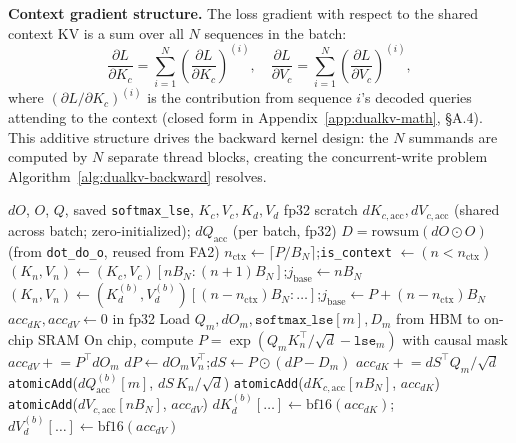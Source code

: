 \documentclass{article}
\begin{document}
\textbf{Context gradient structure.} The loss gradient with respect to the shared context KV is a sum over all $N$ sequences in the batch:
\begin{equation}
  \frac{\partial L}{\partial K_c} = \sum_{i=1}^{N} \left(\frac{\partial L}{\partial K_c}\right)^{(i)}, \quad
  \frac{\partial L}{\partial V_c} = \sum_{i=1}^{N} \left(\frac{\partial L}{\partial V_c}\right)^{(i)},
  \label{eq:dualkv-ctx-grad}
\end{equation}
where $(\partial L / \partial K_c)^{(i)}$ is the contribution from sequence $i$'s decoded queries attending to the context (closed form in Appendix~\ref{app:dualkv-math}, \S A.4). This additive structure drives the backward kernel design: the $N$ summands are computed by $N$ separate thread blocks, creating the concurrent-write problem Algorithm~\ref{alg:dualkv-backward} resolves.


\begin{algorithm}[H]
\small
\caption{DualKV backward main kernel (launched on grid $(n_{\text{ctx}} + n_{\text{dec}},\; N,\; H)$)}
\label{alg:dualkv-backward}
\begin{algorithmic}[1]
\Require $dO$, $O$, $Q$, saved \texttt{softmax\_lse}, $K_c, V_c, K_d, V_d$
\Require fp32 scratch $dK_{c,\text{acc}}, dV_{c,\text{acc}}$ (shared across batch; zero-initialized); $dQ_{\text{acc}}$ (per batch, fp32)
\Require $D = \text{rowsum}(dO \odot O)$ (from \texttt{dot\_do\_o}, reused from FA2)
 
    \State $n_{\text{ctx}} \gets \lceil P / B_N \rceil$;\quad \texttt{is\_context} $\gets (n < n_{\text{ctx}})$
        \State $(K_n, V_n) \gets (K_c, V_c)[n B_N : (n{+}1) B_N]$;\quad $j_{\text{base}} \gets n B_N$
    \Else
        \State $(K_n, V_n) \gets (K_d^{(b)}, V_d^{(b)})[(n{-}n_{\text{ctx}}) B_N : \ldots]$;\quad $j_{\text{base}} \gets P + (n{-}n_{\text{ctx}}) B_N$
    \EndIf
    \State $acc_{dK}, acc_{dV} \gets 0$ in fp32
        \State Load $Q_m, dO_m, \texttt{softmax\_lse}[m], D_m$ from HBM to on-chip SRAM
        \State On chip, compute $P = \exp(Q_m K_n^\top / \sqrt{d} - \texttt{lse}_m)$ with causal mask 
        \State $acc_{dV} \mathrel{+}= P^\top dO_m$
        \State $dP \gets dO_m V_n^\top$;\quad $dS \gets P \odot (dP - D_m)$
        \State $acc_{dK} \mathrel{+}= dS^\top Q_m / \sqrt{d}$
        \State \texttt{atomicAdd}($dQ_{\text{acc}}^{(b)}[m]$,\; $dS\, K_n / \sqrt{d}$) 
    \EndFor
     
        \State \texttt{atomicAdd}($dK_{c,\text{acc}}[n B_N]$,\; $acc_{dK}$)\label{line:dkc-atomic}
        \State \texttt{atomicAdd}($dV_{c,\text{acc}}[n B_N]$,\; $acc_{dV}$)
    \Else {}
        \State $dK_d^{(b)}[\ldots] \gets \text{bf16}(acc_{dK})$;\quad $dV_d^{(b)}[\ldots] \gets \text{bf16}(acc_{dV})$
    \EndIf
\EndFor
\end{algorithmic}
\end{algorithm}
\end{document}

